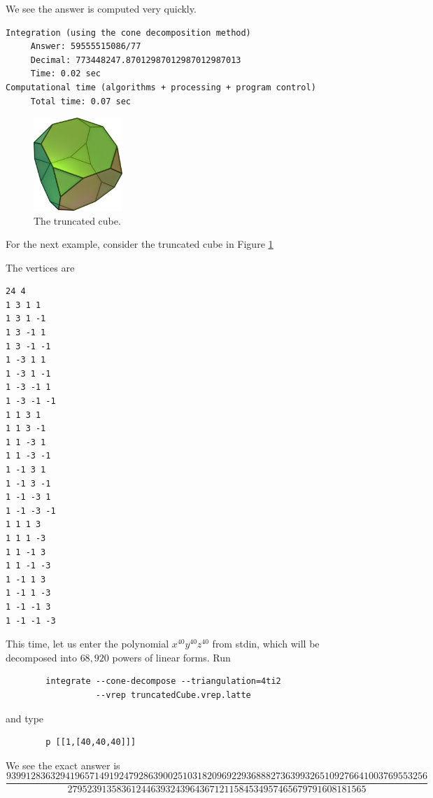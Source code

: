\documentclass{article}
\begin{document}
We see the answer is computed very quickly.
        
\begin{verbatim}        
Integration (using the cone decomposition method)
     Answer: 59555515086/77
     Decimal: 773448247.87012987012987012987013
     Time: 0.02 sec
Computational time (algorithms + processing + program control)
     Total time: 0.07 sec
\end{verbatim}  
        
\begin{figure}[thb]
        \centering
        \includegraphics[width=0.3\textwidth]{truncatedCube.jpg}
\caption{The truncated cube.}
        \label{fig:truncated-cube}
\end{figure}    
        
For the next example, consider the truncated cube in Figure \ref{fig:truncated-cube}    

        
The vertices are
\begin{verbatim}
24 4
1 3 1 1
1 3 1 -1
1 3 -1 1
1 3 -1 -1
1 -3 1 1
1 -3 1 -1
1 -3 -1 1
1 -3 -1 -1
1 1 3 1
1 1 3 -1
1 1 -3 1
1 1 -3 -1
1 -1 3 1
1 -1 3 -1
1 -1 -3 1
1 -1 -3 -1
1 1 1 3
1 1 1 -3
1 1 -1 3
1 1 -1 -3
1 -1 1 3
1 -1 1 -3
1 -1 -1 3
1 -1 -1 -3
\end{verbatim}

This time, let us enter the polynomial $x^{40}y^{40}z^{40}$ from stdin, which
will be decomposed into $68,920$ powers of linear forms. Run
        
        \begin{verbatim}
        integrate --cone-decompose --triangulation=4ti2 
                  --vrep truncatedCube.vrep.latte 
        \end{verbatim}

and type
        \begin{verbatim}
        p [[1,[40,40,40]]]
        \end{verbatim}
We see the exact answer is 
{  \tiny
\begin{displaymath}
\frac{93991283632941965714919247928639002510318209692293688827363993265109276641003769553256}{2795239135836124463932439643671211584534957465679791608181565}
\end{displaymath}
}
        
\end{document}
